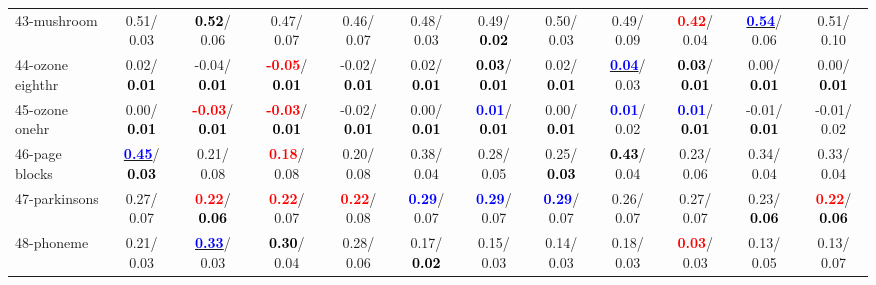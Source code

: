 \begin{table}[h]
\begin{center}
{\begin{tabular}{lc|c|c|c|c|c|c|c|c|c|c}
43-mushroom &   0.51/  0.03 & \textcolor{black}{\textbf{  0.52}}/  0.06 &   0.47/  0.07 &   0.46/  0.07 &   0.48/  0.03 &   0.49/\textcolor{black}{\textbf{  0.02}} &   0.50/  0.03 &   0.49/  0.09 & \textcolor{red}{\textbf{  0.42}}/  0.04 & \underline{\textcolor{blue}{\textbf{  0.54}}}/  0.06 &   0.51/  0.10 \\
44-ozone eighthr &   0.02/\textcolor{black}{\textbf{  0.01}} &  -0.04/\textcolor{black}{\textbf{  0.01}} & \textcolor{red}{\textbf{ -0.05}}/\textcolor{black}{\textbf{  0.01}} &  -0.02/\textcolor{black}{\textbf{  0.01}} &   0.02/\textcolor{black}{\textbf{  0.01}} & \textcolor{black}{\textbf{  0.03}}/\textcolor{black}{\textbf{  0.01}} &   0.02/\textcolor{black}{\textbf{  0.01}} & \underline{\textcolor{blue}{\textbf{  0.04}}}/  0.03 & \textcolor{black}{\textbf{  0.03}}/\textcolor{black}{\textbf{  0.01}} &   0.00/\textcolor{black}{\textbf{  0.01}} &   0.00/\textcolor{black}{\textbf{  0.01}} \\
45-ozone onehr &   0.00/\textcolor{black}{\textbf{  0.01}} & \textcolor{red}{\textbf{ -0.03}}/\textcolor{black}{\textbf{  0.01}} & \textcolor{red}{\textbf{ -0.03}}/\textcolor{black}{\textbf{  0.01}} &  -0.02/\textcolor{black}{\textbf{  0.01}} &   0.00/\textcolor{black}{\textbf{  0.01}} & \textcolor{blue}{\textbf{  0.01}}/\textcolor{black}{\textbf{  0.01}} &   0.00/\textcolor{black}{\textbf{  0.01}} & \textcolor{blue}{\textbf{  0.01}}/  0.02 & \textcolor{blue}{\textbf{  0.01}}/\textcolor{black}{\textbf{  0.01}} &  -0.01/\textcolor{black}{\textbf{  0.01}} &  -0.01/  0.02 \\
46-page blocks & \underline{\textcolor{blue}{\textbf{  0.45}}}/\textcolor{black}{\textbf{  0.03}} &   0.21/  0.08 & \textcolor{red}{\textbf{  0.18}}/  0.08 &   0.20/  0.08 &   0.38/  0.04 &   0.28/  0.05 &   0.25/\textcolor{black}{\textbf{  0.03}} & \textcolor{black}{\textbf{  0.43}}/  0.04 &   0.23/  0.06 &   0.34/  0.04 &   0.33/  0.04 \\ \hline
47-parkinsons &   0.27/  0.07 & \textcolor{red}{\textbf{  0.22}}/\textcolor{black}{\textbf{  0.06}} & \textcolor{red}{\textbf{  0.22}}/  0.07 & \textcolor{red}{\textbf{  0.22}}/  0.08 & \textcolor{blue}{\textbf{  0.29}}/  0.07 & \textcolor{blue}{\textbf{  0.29}}/  0.07 & \textcolor{blue}{\textbf{  0.29}}/  0.07 &   0.26/  0.07 &   0.27/  0.07 &   0.23/\textcolor{black}{\textbf{  0.06}} & \textcolor{red}{\textbf{  0.22}}/\textcolor{black}{\textbf{  0.06}} \\
48-phoneme &   0.21/  0.03 & \underline{\textcolor{blue}{\textbf{  0.33}}}/  0.03 & \textcolor{black}{\textbf{  0.30}}/  0.04 &   0.28/  0.06 &   0.17/\textcolor{black}{\textbf{  0.02}} &   0.15/  0.03 &   0.14/  0.03 &   0.18/  0.03 & \textcolor{red}{\textbf{  0.03}}/  0.03 &   0.13/  0.05 &   0.13/  0.07 \\

\end{tabular}}
\end{center}
\end{table}
